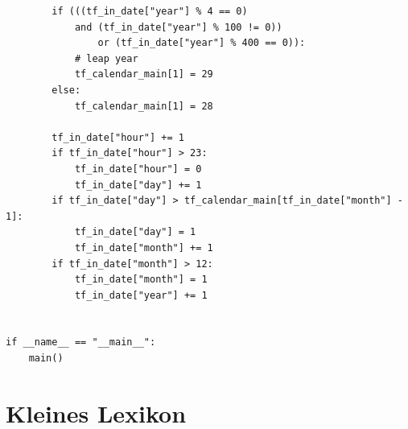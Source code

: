 \begin{tiny}
\begin{ttfamily}
\begin{verbatim}
        if (((tf_in_date["year"] % 4 == 0)
            and (tf_in_date["year"] % 100 != 0))
                or (tf_in_date["year"] % 400 == 0)):
            # leap year
            tf_calendar_main[1] = 29
        else:
            tf_calendar_main[1] = 28

        tf_in_date["hour"] += 1
        if tf_in_date["hour"] > 23:
            tf_in_date["hour"] = 0
            tf_in_date["day"] += 1
        if tf_in_date["day"] > tf_calendar_main[tf_in_date["month"] - 1]:
            tf_in_date["day"] = 1
            tf_in_date["month"] += 1
        if tf_in_date["month"] > 12:
            tf_in_date["month"] = 1
            tf_in_date["year"] += 1


if __name__ == "__main__":
    main()
\end{verbatim}
\end{ttfamily}
\end{tiny}


\chapter{Kleines Lexikon}

